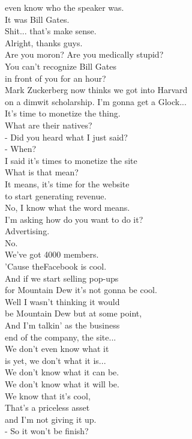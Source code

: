 \documentclass{article}
\begin{document}
\begin{multicols}{3}
even know who the speaker was.\\
It was Bill Gates.\\
Shit... that's make sense.\\
Alright, thanks guys.\\
Are you moron? Are you medically stupid?\\
You can't recognize Bill Gates\\
in front of you for an hour?\\
Mark Zuckerberg now thinks we got into Harvard\\
on a dimwit scholarship. I'm gonna get a Glock...\\
It's time to monetize the thing.\\
What are their natives?\\
- Did you heard what I just said?\\
- When?\\
I said it's times to monetize the site\\
What is that mean?\\
It means, it's time for the website\\
to start generating revenue.\\
No, I know what the word means.\\
I'm asking how do you want to do it?\\
Advertising.\\
No.\\
We've got 4000 members.\\
'Cause theFacebook is cool.\\
And if we start selling pop-ups\\
for Mountain Dew it's not gonna be cool.\\
Well I wasn't thinking it would\\
be Mountain Dew but at some point,\\
And I'm talkin' as the business\\
end of the company, the site...\\
We don't even know what it\\
is yet, we don't what it is...\\
We don't know what it can be.\\
We don't know what it will be.\\
We know that it's cool,\\
That's a priceless asset\\
and I'm not giving it up.\\
- So it won't be finish?\\

\end{multicols}
\end{document}
